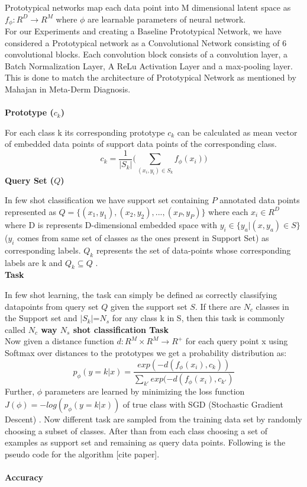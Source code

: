Prototypical networks map each data point into M dimensional latent space as  \(f_\phi: R^D\rightarrow R^M\) where \(\phi\) are learnable parameters of neural network.\\
For our Experiments and creating a Baseline Prototypical Network, we have considered a Prototypical network as a Convolutional Network consisting of 6 convolutional blocks. Each convolution block consists of a convolution layer, a Batch Normalization Layer, A ReLu Activation Layer and a max-pooling layer. This is done to match the architecture of Prototypical Network as mentioned by Mahajan in Meta-Derm Diagnosis.\\\\
\textbf{Prototype (\(c_k\))}

 For each class k its corresponding prototype \(c_k\) can be calculated as  mean vector of embedded data points of support data points of the corresponding class. 
\begin{equation}
  {c_k = \frac{1}{|S_k|} \Big(\sum_{(x_i,y_i)\in S_k} f_\phi(x_i)\Big)}
\end{equation}\textbf{Query Set (\(Q\))}

In few shot classification we have support set containing \(P\) annotated data points represented as \(Q = \{(x_1,y_1),(x_2,y_2),...,(x_P,y_P)\}\) where each \(x_i \in R^D\) where D is represents D-dimensional embedded space with \(y_i \in \{ y_a \big| (x, y_a) \in S\}\) (\(y_i\) comes from same set of classes as the ones present in Support Set) as corresponding labels. \(Q_k\) represents the set of data-points whose corresponding labels are k and \(Q_k \subseteq Q\) .\\
\textbf{Task}

In few shot learning, the task can simply be defined as correctly classifying datapoints from query set \(Q\) given the support set \(S\). If there are \(N_c\) classes in the Support set and \(|S_k|\)=\(N_s\) for any class k in S, then this task is commonly called \textbf{ \(N_c\) way \(N_s\) shot classification Task}\\

Now given a distance function \(d:R^M \times R^M\rightarrow R^+\) for each query point x using Softmax over distances to the prototypes we get a probability distribution as:
\[
   {p_\phi (y=k|x)= \frac{exp(-d(f_\phi(x_i),c_k))}{\sum_{k'} exp(-d(f_\phi(x_i),c_{k'}) }}
\]
Further, \(\phi\) parameters are learned by minimizing the loss function \(J(\phi) = -log(p_\phi (y=k|x))\) of true class with SGD (Stochastic Gradient Descent) . Now different task are sampled from the training data set by randomly choosing a subset of classes. After than from each class choosing a set of examples as support set and remaining as query data points. Following is the pseudo code for the algorithm [cite paper].\\\\
\textbf{Accuracy}

